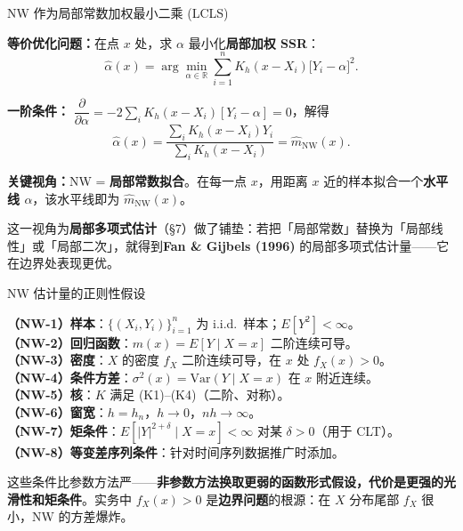 \documentclass[aspectratio=169, 10pt]{beamer}
\begin{document}
\begin{frame}{NW 作为局部常数加权最小二乘 (LCLS)}

  \textbf{等价优化问题：}在点 $x$ 处，求 $\alpha$ 最小化\textbf{局部加权 SSR}：
  \[
    \hat\alpha(x) = \arg\min_{\alpha\in\mathbb{R}} \sum_{i=1}^n K_h(x-X_i)\bigl[Y_i - \alpha\bigr]^2.
  \]

  \textbf{一阶条件：} $\dfrac{\partial}{\partial\alpha} = -2\sum_i K_h(x-X_i)[Y_i - \alpha] = 0$，解得
  \[
    \hat\alpha(x) = \frac{\sum_i K_h(x-X_i) Y_i}{\sum_i K_h(x-X_i)} = \hat m_{\text{NW}}(x).
  \]

  \begin{highlightbox}
    \textbf{关键视角：}NW = \textbf{局部常数拟合}。在每一点 $x$，用距离 $x$ 近的样本拟合一个\textbf{水平线 $\alpha$}，该水平线即为 $\hat m_{\text{NW}}(x)$。

    \vspace{0.3em}
    这一视角为\textbf{局部多项式估计}（\S7）做了铺垫：若把「局部常数」替换为「局部线性」或「局部二次」，就得到\textbf{Fan \& Gijbels (1996)} 的局部多项式估计量——它在边界处表现更优。
  \end{highlightbox}

\end{frame}


\begin{frame}{NW 估计量的正则性假设}
  \begin{assumptionbox}
    \textbf{（NW-1）样本}：$\{(X_i,Y_i)\}_{i=1}^n$ 为 i.i.d.\ 样本；$E[Y^2]<\infty$。\\
    \textbf{（NW-2）回归函数}：$m(x) = E[Y\mid X=x]$ 二阶连续可导。\\
    \textbf{（NW-3）密度}：$X$ 的密度 $f_X$ 二阶连续可导，在 $x$ 处 $f_X(x)>0$。\\
    \textbf{（NW-4）条件方差}：$\sigma^2(x) = \text{Var}(Y\mid X=x)$ 在 $x$ 附近连续。\\
    \textbf{（NW-5）核}：$K$ 满足 (K1)--(K4)（二阶、对称）。\\
    \textbf{（NW-6）窗宽}：$h = h_n$，$h\to 0$，$nh\to\infty$。\\
    \textbf{（NW-7）矩条件}：$E[|Y|^{2+\delta}\mid X=x] < \infty$ 对某 $\delta>0$（用于 CLT）。\\
    \textbf{（NW-8）等变差序列条件}：针对时间序列数据推广时添加。
  \end{assumptionbox}

  \begin{keybox}
    这些条件比参数方法严——\textbf{非参数方法换取更弱的函数形式假设，代价是更强的光滑性和矩条件}。实务中 $f_X(x) > 0$ 是\textbf{边界问题}的根源：在 $X$ 分布尾部 $f_X$ 很小，NW 的方差爆炸。
  \end{keybox}
\end{frame}
\end{document}

